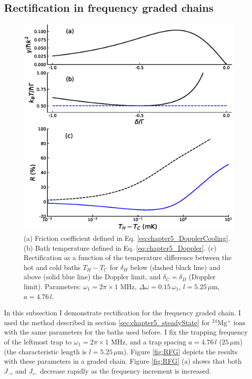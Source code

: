 \subsection{Rectification in frequency graded chains \label{GradedChains}}
%
%
\begin{figure}
  \center
  \includegraphics[width=0.75\linewidth]{Figures/R_as_function_of_TemperatureBias.eps}
  \caption{ (a) Friction coefficient defined in Eq. \eqref{eq:chapter5_DopplerCooling}. (b) Bath temperature defined in Eq. \eqref{eq:chapter5_Doppler}. (c) Rectification as a function of the temperature difference between the hot and cold baths $T_H -T_C$ for $\delta_H$ below (dashed black line) and above (solid blue line) the Doppler limit, and $\delta_C=\delta_D$ (Doppler limit). Parameters: $\omega_1 = 2 \pi \times 1$ MHz, $\Delta \omega = 0.15 \, \omega_1$, $l = 5.25\,\mu$m, $a = 4.76 \, l$.}
  \label{fig:RD}
\end{figure}
%
In this subsection I demonstrate rectification for the frequency graded chain. I  used the method described in section \ref{sec:chapter5_steadyState} for $^{24}$Mg$^+$ ions with the same parameters for the baths used before. I fix the trapping frequency of the leftmost trap to $\omega_1 = 2\pi \times 1$ MHz, and a trap spacing $a = 4.76\, l$ ($25\,\mu$m) (the  characteristic length is $l = 5.25\,\mu$m). Figure \ref{fig:RFG} depicts  the results with these parameters in a graded chain. Figure \ref{fig:RFG} (a) shows that both
$J_\rightarrow$ and $J_\leftarrow$
decrease rapidly as the frequency increment  is increased.
